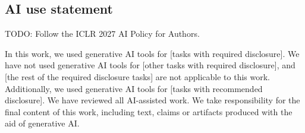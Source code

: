 \subsection*{AI use statement}

TODO: Follow the ICLR 2027 AI Policy for Authors.

In this work, we used generative AI tools for [tasks with required disclosure].
We have not used generative AI tools for [other tasks with required disclosure],
and [the rest of the required disclosure tasks] are not applicable to this work.
Additionally, we used generative AI tools for [tasks with recommended
disclosure]. We have reviewed all AI-assisted work. We take responsibility for
the final content of this work, including text, claims or artifacts produced
with the aid of generative AI.
